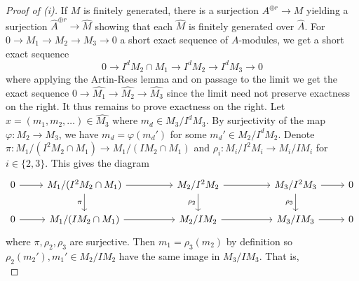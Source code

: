 \begin{proof}[Proof of (i)]
    If $M$ is finitely generated, there is a surjection $A^{\oplus r}\to M$ yielding a surjection $\widehat{A}^{\oplus r}\to\widehat{M}$ showing that each $\widehat{M}$ is finitely generated over $\widehat{A}$. For $0\to M_{1}\to M_{2}\to M_{3}\to0$ a short exact sequence of $A$-modules, we get a short exact sequence 
    $$0\to I^{d}M_{2}\cap M_{1}\to I^{d}M_{2}\to I^{d}M_{3}\to0$$
    where applying the Artin-Rees lemma  and on passage to the limit we get the exact sequence $0\to\widehat{M_{1}}\to\widehat{M_{2}}\to\widehat{M_{3}}$ since the limit need not preserve exactness on the right. It thus remains to prove exactness on the right. Let $x=(m_{1},m_{2},\dots)\in\widehat{M_{3}}$ where $m_{d}\in M_{3}/I^{d}M_{3}$. By surjectivity of the map $\varphi:M_{2}\to M_{3}$, we have $m_{d}=\varphi(m_{d}')$ for some $m_{d}'\in M_{2}/I^{d}M_{2}$. Denote $\pi:M_{1}/(I^{2}M_{2}\cap M_{1})\to M_{1}/(IM_{2}\cap M_{1})$ and $\rho_{i}:M_{i}/I^{2}M_{i}\to M_{i}/IM_{i}$ for $i\in\{2,3\}$. This gives the diagram 
    $$%
    \begin{tikzcd}
        0 & {M_{1}/(I^{2}M_{2}\cap M_{1})} && {M_{2}/I^{2}M_{2}} && {M_{3}/I^{2}M_{3}} & 0 \\
        0 & {M_{1}/(IM_{2}\cap M_{1})} && {M_{2}/IM_{2}} && {M_{3}/IM_{3}} & 0
        \arrow[from=1-1, to=1-2]
        \arrow[from=1-2, to=1-4]
        \arrow["\pi"', from=1-2, to=2-2]
        \arrow[from=1-4, to=1-6]
        \arrow["{\rho_{2}}"', from=1-4, to=2-4]
        \arrow[from=1-6, to=1-7]
        \arrow["{\rho_{3}}"', from=1-6, to=2-6]
        \arrow[from=2-1, to=2-2]
        \arrow[from=2-2, to=2-4]
        \arrow[from=2-4, to=2-6]
        \arrow[from=2-6, to=2-7]
    \end{tikzcd}$$
    where $\pi,\rho_{2},\rho_{3}$ are surjective. Then $m_{1}=\rho_{3}(m_{2})$ by definition so $\rho_{2}(m_{2}'),m_{1}'\in M_{2}/IM_{2}$ have the same image in $M_{3}/IM_{3}$. That is, 
    $$%
$$
\end{proof}
